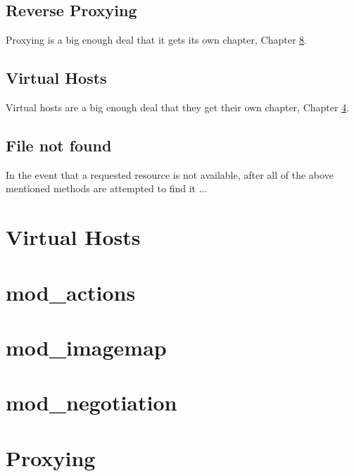 \section{Reverse Proxying}

Proxying is a big enough deal that it gets its own chapter, Chapter \ref{chapter_proxy}.

\section{Virtual Hosts}

Virtual hosts are a big enough deal that they get their own chapter, Chapter \ref{chapter_vhosts}.

\section{File not found}

In the event that a requested resource is not available, after all of the above mentioned methods are attempted to find it ...

\chapter{Virtual Hosts}
\label{chapter_vhosts}

\chapter{mod\_actions}

\chapter{mod\_imagemap}

\chapter{mod\_negotiation}

\chapter{Proxying}
\label{chapter_proxy}